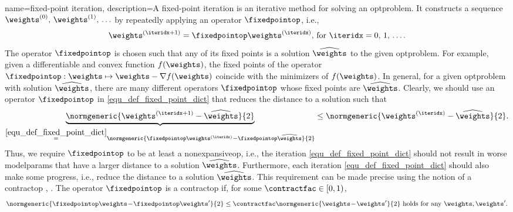 {name={fixed-point iteration},
	description={A fixed-point iteration is an iterative method 
	     for solving an \gls{optproblem}. It constructs a \gls{sequence} $\weights^{(0)}, \,\weights^{(1)}, \,\ldots$ by 
		 repeatedly applying an operator $\fixedpointop$, i.e., 
		 \begin{equation} 
		 	\label{equ_def_fixed_point_dict} 
		 	\weights^{(\iteridx+1)} = \fixedpointop \weights^{(\iteridx)} \mbox{, for } \iteridx=0, \,1, \,\ldots.
		 \end{equation} 
		 The operator $\fixedpointop$ is chosen such that any of its fixed points is a solution 
		 $\widehat{\weights}$ to the given \gls{optproblem}. For example, given a \gls{differentiable} and 
		 \gls{convex} \gls{function} $f(\weights)$, the fixed points of the \gls{operator} $\fixedpointop: \weights \mapsto \weights - \nabla f(\weights)$ 
		 coincide with the minimizers of $f(\weights)$. In general, for a given \gls{optproblem} 
		 with solution $\widehat{\weights}$, there are many different \glspl{operator} 
		 $\fixedpointop$ whose fixed points are $\widehat{\weights}$. Clearly, we should use an 
		 \gls{operator} $\fixedpointop$ in \eqref{equ_def_fixed_point_dict} that reduces the 
		 distance to a solution such that
		 \begin{equation} 
			\nonumber
			\underbrace{\normgeneric{ \weights^{(\iteridx+1)} - \widehat{\weights}}{2}}_{\stackrel{\eqref{equ_def_fixed_point_dict}}{=} \normgeneric{ \fixedpointop \weights^{(\iteridx)} - \fixedpointop\widehat{\weights}}{2}}  \leq 	\normgeneric{ \weights^{(\iteridx)} - \widehat{\weights}}{2}. 
		\end{equation}
		Thus, we require $\fixedpointop$ to be at least a \gls{nonexpansiveop}, i.e., the iteration \eqref{equ_def_fixed_point_dict} 
		should not result in worse \glspl{modelparam} that have a larger distance to a solution $\widehat{\weights}$. 
		Furthermore, each iteration \eqref{equ_def_fixed_point_dict} should also make some progress, i.e., 
		reduce the distance to a solution $\widehat{\weights}$. This requirement can be made precise using 
		the notion of a \gls{contractop} \cite{Bauschke:2017}, \cite{fixedpoinIsta}. 
		The \gls{operator} $\fixedpointop$ is a \gls{contractop} if, for some $\contractfac \in [0,1)$,
		\begin{equation} 
			\nonumber
			\normgeneric{ \fixedpointop \weights\!-\!\fixedpointop \weights'}{2}  \leq  \contractfac	\normgeneric{\weights\!-\!\weights'}{2} \mbox{ holds for any } \weights,\weights'.

\end{equation}}}
